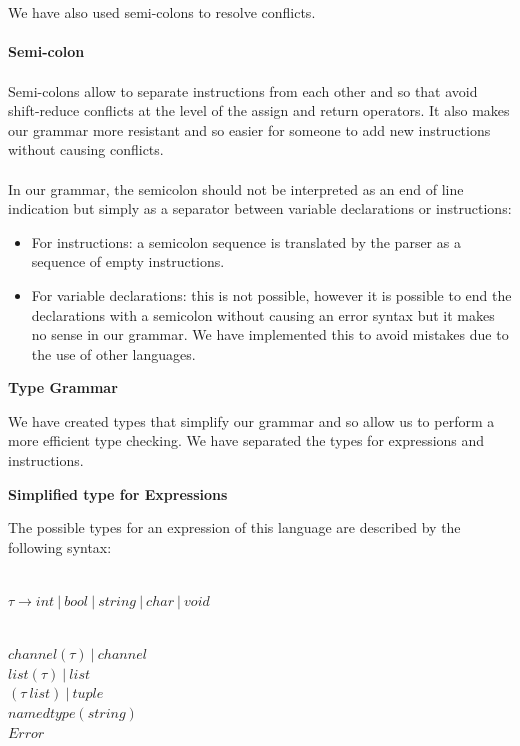 \documentclass[11pt]{report}
\begin{document}
\\ \\
\newpage
We have also used semi-colons to resolve conflicts. \\ \\
\tabto{2cm} \textbf{Semi-colon} \\ \\
\tabto{1cm}Semi-colons allow to separate instructions from each other and so that avoid shift-reduce conflicts at the level of the assign and return operators. It also makes our grammar more resistant and so easier for someone to add new instructions without causing conflicts. \\ \\
\tabto{1cm} In our grammar, the semicolon should not be interpreted as an end of line indication but simply as a separator between variable declarations or instructions:
\begin{itemize}
\item For instructions: a semicolon sequence is translated by the parser as a sequence of empty instructions.
\item For variable declarations: this is not possible, however it is possible to end the declarations with a semicolon without causing an error syntax but it makes no sense in our grammar. We have implemented this to avoid mistakes due to the use of other languages.
\end{itemize}

\newpage
\centerline{\textbf{\Huge Type Grammar}}
\vspace*{3pt}
\vspace*{20pt}
We have created types that simplify our grammar and so allow us to perform a more efficient type checking. We have separated the types for expressions and instructions.

\tabto{0cm} {\Large \textbf{Simplified type for Expressions}}

\tabto{0cm}The possible types for an expression of this language are described by the following syntax:
\\ \\
\centerline{$\tau \rightarrow int \ | \ bool \ | \ string \ | \ char \ | \ void$} \\
$ channel( \tau) \ | \ channel $ \\
$ list(\tau) \ | \ list $ \\
$ ( \tau \ list) \ | \ tuple $ \\
$ namedtype(string)$ \\
$ Error $
\end{document}
